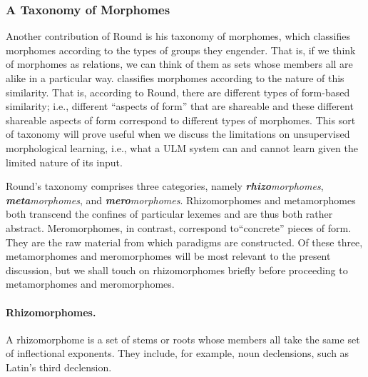 {\subsubsection{A Taxonomy of Morphomes}
Another contribution of Round is his taxonomy of morphomes, which 
classifies morphomes according to the types of groups they engender. 
That is, if we think of morphomes as relations, we can think of them as 
sets whose members all are alike in a particular way. \cite{round:2015, round:md:2016} 
classifies morphomes according to the nature of this similarity. That is, 
according to Round, there are different types of form-based similarity; i.e., different ``aspects of form'' that are 
shareable \citep[][p.230]{round:md:2016} and these different shareable aspects of form correspond to different types of morphomes. 
This sort of taxonomy will prove useful when we discuss the 
limitations on unsupervised morphological learning, i.e., what a ULM 
system can and cannot learn given the limited nature of its input.

Round's taxonomy comprises three categories, namely 
\textit{\textbf{rhizo}morphomes}, \textit{\textbf{meta}morphomes}, 
and \textit{\textbf{mero}morphomes}. 
Rhizomorphomes and metamorphomes both transcend the confines of 
particular lexemes and are thus both
rather abstract. Meromorphomes, in contrast, correspond to``concrete'' 
pieces of form. They are the raw material from which paradigms are constructed. 
Of these three, metamorphomes and meromorphomes will be most 
relevant to the present discussion, but we shall touch on rhizomorphomes briefly 
before proceeding to metamorphomes and meromorphomes.

\paragraph{Rhizomorphomes.} A rhizomorphome is a set of stems or roots
 whose members all take the same set of inflectional exponents. They include, for example,
 noun declensions, such as Latin's third declension.

}
